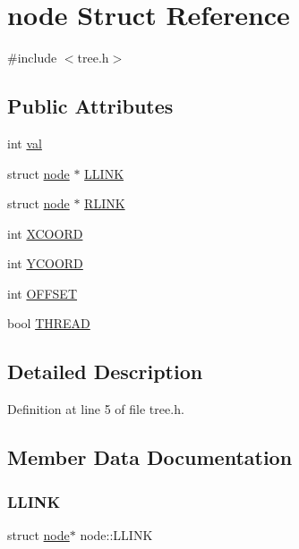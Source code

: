 \hypertarget{structnode}{}\section{node Struct Reference}
\label{structnode}


{\ttfamily \#include $<$tree.\+h$>$}

\subsection*{Public Attributes}
\begin{DoxyCompactItemize}
\item 
int \mbox{\hyperlink{structnode_a707bf3f1eeeaf8974e7e8e90f7bfd6a1}{val}}
\item 
struct \mbox{\hyperlink{structnode}{node}} $\ast$ \mbox{\hyperlink{structnode_a575c85da030190cd1692ba53ad967c18}{L\+L\+I\+NK}}
\item 
struct \mbox{\hyperlink{structnode}{node}} $\ast$ \mbox{\hyperlink{structnode_a4a40cde3bcc46a6b5ce467dbd21efb98}{R\+L\+I\+NK}}
\item 
int \mbox{\hyperlink{structnode_a59e7f1df82b9686721a6770247a16d49}{X\+C\+O\+O\+RD}}
\item 
int \mbox{\hyperlink{structnode_a8e213b00fc3c2193c4c5d2cc9e691f62}{Y\+C\+O\+O\+RD}}
\item 
int \mbox{\hyperlink{structnode_ad7798e0c58f39de43614d2eb281ea3b3}{O\+F\+F\+S\+ET}}
\item 
bool \mbox{\hyperlink{structnode_ac104f38eb93c8f1f49977b3441d5692c}{T\+H\+R\+E\+AD}}
\end{DoxyCompactItemize}


\subsection{Detailed Description}


Definition at line 5 of file tree.\+h.



\subsection{Member Data Documentation}
\mbox{\label{structnode_a575c85da030190cd1692ba53ad967c18}} 
\subsubsection{\texorpdfstring{L\+L\+I\+NK}{LLINK}}
{\footnotesize\ttfamily struct \mbox{\hyperlink{structnode}{node}}$\ast$ node\+::\+L\+L\+I\+NK}



